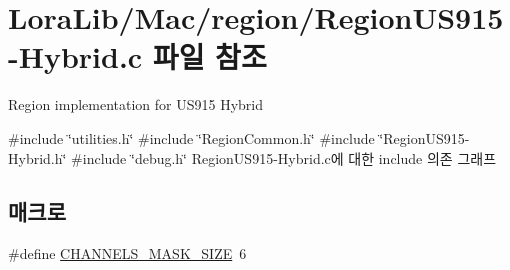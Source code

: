 \hypertarget{_region_u_s915-_hybrid_8c}{}\section{Lora\+Lib/\+Mac/region/\+Region\+U\+S915-\/\+Hybrid.c 파일 참조}
\label{_region_u_s915-_hybrid_8c}


Region implementation for U\+S915 Hybrid  


{\ttfamily \#include \char`\"{}utilities.\+h\char`\"{}}\newline
{\ttfamily \#include \char`\"{}Region\+Common.\+h\char`\"{}}\newline
{\ttfamily \#include \char`\"{}Region\+U\+S915-\/\+Hybrid.\+h\char`\"{}}\newline
{\ttfamily \#include \char`\"{}debug.\+h\char`\"{}}\newline
Region\+U\+S915-\/\+Hybrid.c에 대한 include 의존 그래프
\subsection*{매크로}
\begin{DoxyCompactItemize}
\item 
\#define \mbox{\hyperlink{_region_u_s915-_hybrid_8c_a1b20a8de3ae59c0b063fb313f0c70890}{C\+H\+A\+N\+N\+E\+L\+S\+\_\+\+M\+A\+S\+K\+\_\+\+S\+I\+ZE}}~6
\end{DoxyCompactItemize}
